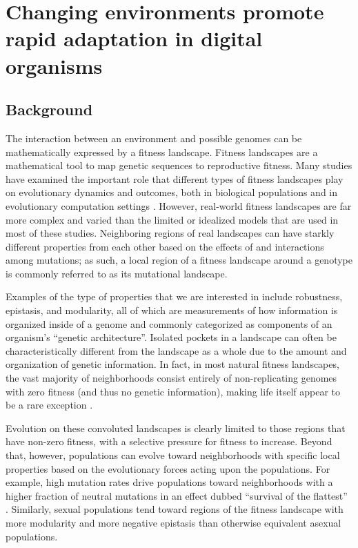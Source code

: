 \documentclass[PhD]{msu-thesis}
\begin{document}
\chapter{Changing environments promote rapid adaptation in digital organisms}
\label{chap:ce-adaptation}

\section{Background}
The interaction between an environment and possible genomes can be mathematically expressed by a fitness landscape.
Fitness landscapes are a mathematical tool to map genetic sequences to reproductive fitness. Many studies have examined the important role that different types of fitness landscapes play on evolutionary dynamics and outcomes, both in biological populations \cite{khan_negative_2011,szendro_quantitative_2013,weinreich_darwinian_2006,nahum_tortoisehare_2015} and in evolutionary computation settings \cite{merz_fitness_2000,humeau_paradiseo-mo:_2013,kallel_theoretical_2013}. However, real-world fitness landscapes are far more complex and varied than the limited or idealized models that are used in most of these studies. Neighboring regions of real landscapes can have starkly different properties from each other based on the effects of and interactions among mutations; as such, a local region of a fitness landscape around a genotype is commonly referred to as its mutational landscape.%

Examples of the type of properties that we are interested in include robustness, epistasis, and modularity, all of which are measurements of how information is organized inside of a genome and commonly categorized as components of an organism's ``genetic architecture''. Isolated pockets in a landscape can often be characteristically different from the landscape as a whole due to the amount and organization of genetic information.  In fact, in most natural fitness landscapes, the vast majority of neighborhoods consist entirely of non-replicating genomes with zero fitness (and thus no genetic information), making life itself appear to be a rare exception \cite{gavrilets_fitness_2004}.

Evolution on these convoluted landscapes is clearly limited to those regions that have non-zero fitness, with a selective pressure for fitness to increase. Beyond that, however, populations can evolve toward neighborhoods with specific local properties based on the evolutionary forces acting upon the populations.  For example, high mutation rates drive populations toward neighborhoods with a higher fraction of neutral mutations in an effect dubbed “survival of the flattest” \cite{wilke_evolution_2001}. Similarly, sexual populations tend toward regions of the fitness landscape with more modularity \cite{misevic_sexual_2006} and more negative epistasis \cite{misevic_experiments_2010} than otherwise equivalent asexual populations.
\end{document}
